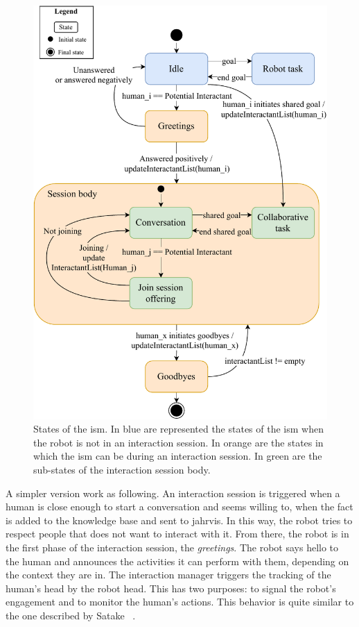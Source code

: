 \documentclass[a4paper,11pt,twoside]{StyleThese}
\begin{document}
\begin{figure}[!htb]
	\centering
	\includegraphics[width=0.8\linewidth]{figures/chapter2/session_manager.pdf}
	\caption{States of the \acrfull{ism}. In blue are represented the states of the \acrshort{ism} when the robot is not in an interaction session. In orange are the states in which the \acrshort{ism} can be during an interaction session. In green are the sub-states of the interaction session body.}
	\label{chap6:fig:session_manager}
\end{figure}

A simpler version work as following. An interaction session is triggered when a human is close enough to start a conversation and seems willing to, \ie when the fact   is added to the knowledge base and sent to \acrshort{jahrvis}. In this way, the robot tries to respect people that does not want to interact with it. From there, the robot is in the first phase of the interaction session, the \textit{greetings}. The robot says hello to the human and announces the activities it can perform with them, depending on the context they are in. The interaction manager triggers the tracking of the human's head by the robot head. This has two purposes: to signal the robot's engagement and to monitor the human's actions. This behavior is quite similar to the one described by Satake \etal~\cite{satake_2015_should}. 
\end{document}
